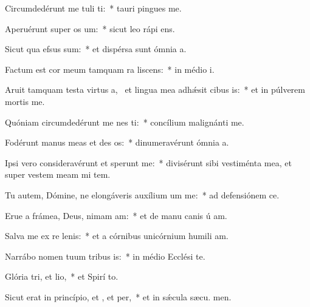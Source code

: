 \item Circumdedérunt me tuli ti:~* tauri pingues  me.
\item Aperuérunt super  os um:~* sicut leo rápi  ens.
\item Sicut qua efsus sum:~* et dispérsa sunt ómnia  a.
\item Factum est cor meum tamquam ra liscens:~* in médio  i.
\item Aruit tamquam testa virtus a,~\pscross{} et lingua mea adhǽsit cibus is:~* et in púlverem mortis  me.
\item Quóniam circumdedérunt me nes ti:~* concílium malignánti  me.
\item Fodérunt manus meas et des os:~* dinumeravérunt ómnia  a.
\item Ipsi vero consideravérunt et sperunt me:~* divisérunt sibi vestiménta mea, et super vestem meam mi tem.
\item Tu autem, Dómine, ne elongáveris auxílium um  me:~* ad defensiónem  ce.
\item Erue a frámea, Deus, nimam am:~* et de manu canis ú am.
\item Salva me ex re lenis:~* et a córnibus unicórnium humili am.
\item Narrábo nomen tuum tribus is:~* in médio Ecclési  te.
\item Glória tri, et lio,~* et Spirí to.
\item Sicut erat in princípio, et , et per,~* et in sǽcula sæcu. men.
